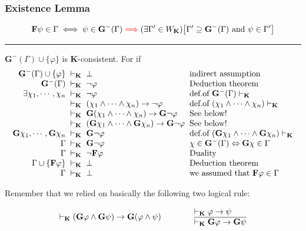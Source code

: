 \documentclass[xcolor=x11names]{beamer}
\newcommand{\hazi}[6]{\begin{tikzpicture}[remember picture,overlay]
\node [ draw=Coral1,
        rectangle,
        rounded corners=#2 mm,
        inner sep=#1mm,
        ultra thick,
        fill=white,
        fill opacity=.8,
        rotate=0,
        scale=#3,
        text opacity=1]
        at ([xshift=#4 cm, yshift=#5 cm]current page.center)
        {#6};
\end{tikzpicture}}
\newcommand{\cemph}[1]{\textcolor{red}{#1}}
\newcommand{\FD}{\mathbf F}
\newcommand{\FB}{\mathbf G}
\newcommand{\lthen}{\rightarrow}
\newcommand{\existsin}[2]{(\exists #1 \in #2)}
\newenvironment{tomb}[2][.1]{\arraycolsep=#1cm\begin{array}{#2}}{\end{array}}
\begin{document}
\begin{frame}
\frametitle{Existence Lemma}

\[\FD \psi \in \Gamma  \iff  \psi \in \FB^-(\Gamma) \mathrel{\cemph{\Longrightarrow}} \existsin {\Gamma'}{W_\mathbf K} \big[\Gamma' \supseteq \FB^-(\Gamma) \textup{ and } \psi \in \Gamma' \big]\]

\hrule
\medskip

$\FB^- (\Gamma) \cup \{\varphi\}$ is $\mathbf K$-consistent. For if
\[ \begin{tomb}{rcll}
   \FB^- (\Gamma) \cup \{\varphi\}&\vdash_{\mathbf K}&\bot &\textup{indirect assumption}
\\ \FB^- (\Gamma)&\vdash_{\mathbf K}& \lnot \varphi &\textup{Deduction theorem}
\\ \exists \chi_1,  \cdots,\chi_{n}&\vdash_{\mathbf K}& \lnot \varphi &\textup{def.of $\FB^- (\Gamma)\vdash_{\mathbf K}$}
\\ &\vdash_{\mathbf K}& (\chi_1 \land \dots \land \chi_{n}) \lthen \lnot \varphi &\textup{def.of $(\chi_1 \land \dots \land \chi_{n})\vdash_{\mathbf K}$}
\\ &\vdash_{\mathbf K}& \FB (\chi_1 \land \dots \land \chi_{n}) \lthen \FB \lnot \varphi &\textup{See below!}
\\ &\vdash_{\mathbf K}& (\FB \chi_1 \land \dots \land \FB\chi_{n})\lthen \FB \lnot \varphi &\textup{See below!}
\\ \FB \chi_1, \cdots ,\FB\chi_{n} &\vdash_{\mathbf K}& \FB \lnot \varphi & \textup{def.of $(\FB \chi_1 \land \dots \land \FB \chi_{n})\vdash_{\mathbf K}$}
\\ \Gamma &\vdash_{\mathbf K}& \FB \lnot \varphi &\chi\in \FB^-(\Gamma) \Leftrightarrow \FB \chi\in \Gamma
\\ \Gamma &\vdash_{\mathbf K}& \lnot \FD\varphi &\textup{Duality}
\\ \Gamma \cup \{ \FD\varphi \}&\vdash_{\mathbf K}& \bot &\textup{Deduction theorem}
\\ \Gamma &\vdash_{\mathbf K}& \bot &\textup{we assumed that $\FD \varphi \in \Gamma$}
\end{tomb}\]

Remember that we relied on basically the following two logical rule:

\[ \vdash_{\mathbf K}(\FB \varphi \land \FB \psi) \lthen \FB (\varphi \land \psi ) \qquad \qquad \begin{tomb}[0]{l} \vdash_{\mathbf K} \varphi \lthen \psi \\ \hline \vdash_{\mathbf K} \FB \varphi \lthen \FB \psi \end{tomb}\]

\end{frame}
\end{document}
